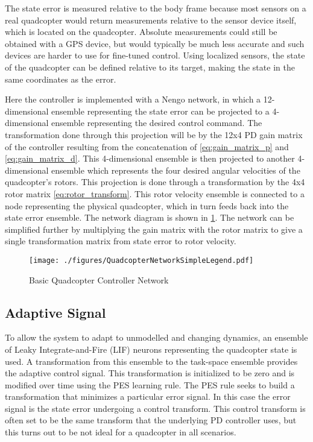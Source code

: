 \documentclass[letterpaper, 10 pt, conference]{ieeeconf}  %
\begin{document}
The state error is measured relative to the body frame because most sensors on a real quadcopter would return measurements relative to the sensor device itself, which is located on the quadcopter. Absolute measurements could still be obtained with a GPS device, but would typically be much less accurate and such devices are harder to use for fine-tuned control. Using localized sensors, the state of the quadcopter can be defined relative to its target, making the state in the same coordinates as the error.

Here the controller is implemented with a Nengo network, in which a 12-dimensional ensemble representing the state error can be projected to a 4-dimensional ensemble representing the desired control command. 
The transformation done through this projection will be by the 12x4 PD gain matrix of the controller resulting from the concatenation of \eqref{eq:gain_matrix_p} and \eqref{eq:gain_matrix_d}. 
This 4-dimensional ensemble is then projected to another 4-dimensional ensemble which represents the four desired angular velocities of the quadcopter's rotors. 
This projection is done through a transformation by the 4x4 rotor matrix \eqref{eq:rotor_transform}. 
This rotor velocity ensemble is connected to a node representing the physical quadcopter, which in turn feeds back into the state error ensemble. 
The network diagram is shown in \ref{fig:NetBasic}. 
The network can be simplified further by multiplying the gain matrix with the rotor matrix to give a single transformation matrix from state error to rotor velocity. 

\begin{figure}
\centering
\texttt{[image: ./figures/QuadcopterNetworkSimpleLegend.pdf]}
\caption{Basic Quadcopter Controller Network}
\label{fig:NetBasic}
\end{figure}

\subsection{Adaptive Signal}

To allow the system to adapt to unmodelled and changing dynamics, an ensemble of Leaky Integrate-and-Fire (LIF) neurons representing the quadcopter state is used.
A transformation from this ensemble to the task-space ensemble provides the adaptive control signal.
This transformation is initialized to be zero and is modified over time using the PES learning rule.
The PES rule seeks to build a transformation that minimizes a particular error signal.
In this case the error signal is the state error undergoing a control transform.
This control transform is often set to be the same transform that the underlying PD controller uses, but this turns out to be not ideal for a quadcopter in all scenarios.
\end{document}
